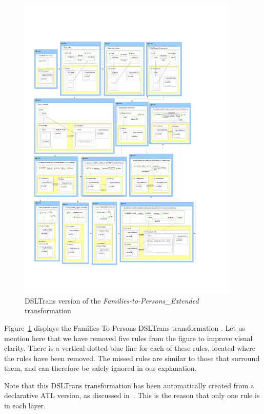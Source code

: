 \begin{figure}
  \begin{center}
  \includegraphics[width=0.94\textwidth]{figures/FamToPersons/DSLTrans_Rules_javi}
  \caption{DSLTrans version of the \emph{Families-to-Persons\_Extended} transformation}
  \label{fig:DSLTrans_rules}
  \end{center}
\end{figure}


Figure~\ref{fig:DSLTrans_rules} displays the Families-To-Persons DSLTrans transformation . Let us mention here that we have removed five rules from the figure to improve visual clarity.
There is a vertical dotted blue line for each of these rules, located where the rules have been removed. The missed rules are similar to those that surround them, and can therefore be safely ignored in our explanation.

Note that this DSLTrans transformation has been automatically created from a declarative ATL version, as discussed in~\cite{Oakes2016}. This is the reason that only one rule is in each layer.

